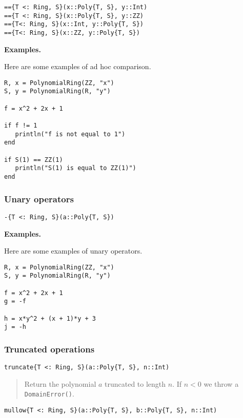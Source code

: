 \documentclass[a4paper,10pt]{article}
\newcommand{\code}{\lstinline}
\newcommand{\desc}[1]{\vspace{-3mm}\begin{quote}#1\end{quote}}
\begin{document}
{{\begin{lstlisting}
=={T <: Ring, S}(x::Poly{T, S}, y::Int)
=={T <: Ring, S}(x::Poly{T, S}, y::ZZ)
=={T<: Ring, S}(x::Int, y::Poly{T, S})
=={T<: Ring, S}(x::ZZ, y::Poly{T, S})
\end{lstlisting}

\textbf{Examples.}

Here are some examples of ad hoc comparison.

\begin{lstlisting}
R, x = PolynomialRing(ZZ, "x")
S, y = PolynomialRing(R, "y")

f = x^2 + 2x + 1

if f != 1
   println("f is not equal to 1")
end

if S(1) == ZZ(1)
   println("S(1) is equal to ZZ(1)")
end
\end{lstlisting}

\subsubsection{Unary operators}

\begin{lstlisting}
-{T <: Ring, S}(a::Poly{T, S})
\end{lstlisting}

\textbf{Examples.}

Here are some examples of unary operators.

\begin{lstlisting}
R, x = PolynomialRing(ZZ, "x")
S, y = PolynomialRing(R, "y")

f = x^2 + 2x + 1
g = -f

h = x*y^2 + (x + 1)*y + 3
j = -h
\end{lstlisting}

\subsubsection{Truncated operations}

\begin{lstlisting}
truncate{T <: Ring, S}(a::Poly{T, S}, n::Int)
\end{lstlisting}

\desc{Return the polynomial $a$ truncated to length $n$. If $n < 0$ we throw a
\code{DomainError()}.}

\begin{lstlisting}
mullow{T <: Ring, S}(a::Poly{T, S}, b::Poly{T, S}, n::Int)
\end{lstlisting}

}}
\end{document}
